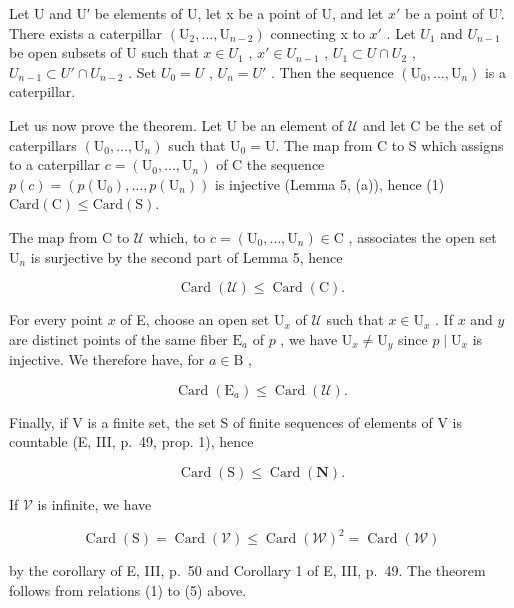 Let U and U′ be elements of U, let x be a point of U, and let \(x'\) be a point of U'. There exists a caterpillar \((\mathrm{U}_{2},\ldots,\mathrm{U}_{n-2})\) connecting x to \(x'\) . Let \(U_{1}\) and \(U_{n-1}\) be open subsets of U such that \(x \in U_{1}\) , \(x' \in U_{n-1}\) , \(U_{1} \subset U \cap U_{2}\) , \(U_{n-1} \subset U' \cap U_{n-2}\) . Set \(U_{0} = U\) , \(U_{n} = U'\) . Then the sequence \((\mathrm{U}_{0},\ldots,\mathrm{U}_{n})\) is a caterpillar.

Let us now prove the theorem. Let U be an element of \(\mathcal{U}\) and let C be the set of caterpillars \((\mathrm{U}_0,\dots ,\mathrm{U}_n)\) such that \(\mathrm{U}_0 = \mathrm{U}\). The map from C to S which assigns to a caterpillar \(c = (\mathrm{U}_0,\dots ,\mathrm{U}_n)\) of C the sequence \(p(c) = (p(\mathrm{U}_{0}), \ldots, p(\mathrm{U}_{n}))\) is injective (Lemma 5, (a)), hence (1) \(\text{Card}(\mathrm{C}) \leqslant \text{Card}(\mathrm{S}).\)

The map from C to \(\mathcal{U}\) which, to \(c = (\mathrm{U}_0,\dots ,\mathrm{U}_n)\in \mathrm{C}\) , associates the open set \(\mathrm{U}_n\) is surjective by the second part of Lemma 5, hence

\[
\operatorname{Card} (\mathcal {U}) \leqslant \operatorname{Card} (\mathrm{C}).\tag{2}
\]

For every point \(x\) of E, choose an open set \(\mathrm{U}_x\) of \(\mathcal{U}\) such that \(x \in \mathrm{U}_x\) . If \(x\) and \(y\) are distinct points of the same fiber \(\mathrm{E}_a\) of \(p\) , we have \(\mathrm{U}_x \neq \mathrm{U}_y\) since \(p \mid \mathrm{U}_x\) is injective. We therefore have, for \(a \in \mathrm{B}\) ,

\[
\operatorname{Card} \left(\mathrm{E} _ {a}\right) \leqslant \operatorname{Card} (\mathcal {U}).\tag{3}
\]

Finally, if V is a finite set, the set S of finite sequences of elements of V is countable (E, III, p.~49, prop. 1), hence

\[
\operatorname{Card} (\mathrm{S}) \leqslant \operatorname{Card} (\mathbf {N}).\tag{4}
\]

If \(\mathcal{V}\) is infinite, we have

\[
\operatorname{Card} (\mathrm{S}) = \operatorname{Card} (\mathcal {V}) \leqslant \operatorname{Card} (\mathcal {W}) ^ {2} = \operatorname{Card} (\mathcal {W})\tag{5}
\]

by the corollary of E, III, p.~50 and Corollary 1 of E, III, p.~49. The theorem follows from relations (1) to (5) above.

